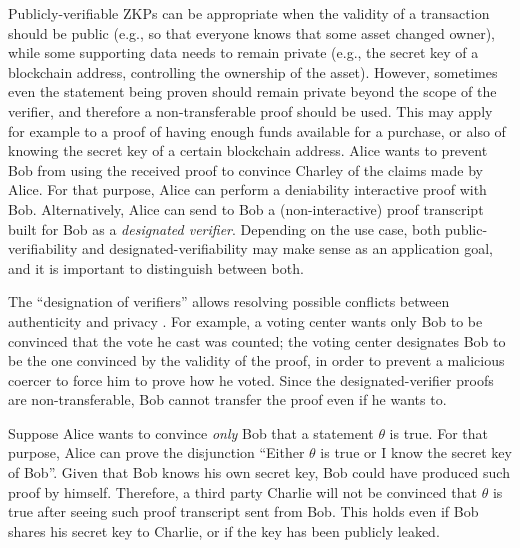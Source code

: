 	
	Publicly-verifiable ZKPs can be appropriate when the validity of a transaction should be public 
(e.g., so that everyone knows that some asset changed owner), while some supporting data needs to remain private 
(e.g., the secret key of a blockchain address, controlling the ownership of the asset).
	However, sometimes even the statement being proven should remain private beyond the scope of the verifier, and therefore a non-transferable proof	should be used.
	This may apply for example to a proof of having enough funds available for a purchase, or also of knowing the secret key of a certain blockchain address.
	Alice wants to prevent Bob from using the received proof to convince Charley of the claims made by Alice.
	For that purpose, Alice can perform a deniability interactive proof with Bob.
	Alternatively, Alice can send to Bob a (non-interactive) proof transcript built for Bob as a \emph{designated verifier}.
	Depending on the use case, both public-verifiability and designated-verifiability may make sense as an application goal, and it is important to distinguish between both.



	
	The ``designation of verifiers'' allows resolving possible conflicts between authenticity and privacy \cite{1996:eurocrypt:designated-verifier-proofs}.
	For example, a voting center wants only Bob to be convinced that the vote he cast was counted;
	the voting center designates Bob to be the one convinced by the validity of the proof, 
in order to prevent a malicious coercer to force him to prove how he voted.
	Since the designated-verifier proofs are non-transferable, Bob cannot transfer the proof even if he wants to.


	Suppose Alice wants to convince \emph{only} Bob that a statement $\theta$ is true.
	For that purpose, Alice can prove the disjunction ``Either $\theta$ is true or I know the secret key of Bob''.
	Given that Bob knows his own secret key, Bob could have produced such proof by himself.
	Therefore, a third party Charlie will not be convinced that $\theta$ is true after seeing such proof transcript sent from Bob.
	This holds even if Bob shares his secret key to Charlie, or if the key has been publicly leaked.

